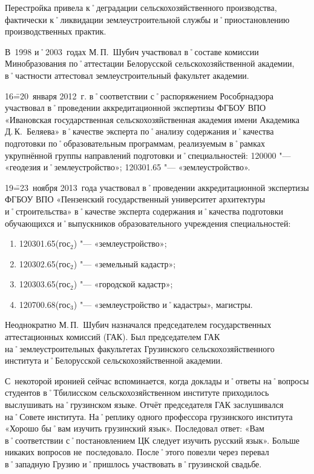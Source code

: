 Перестройка привела к˚деградации сельскохозяйственного производства, фактически к˚ликвидации землеустроительной службы и˚приостановлению производственных практик. 

В~1998 и˚2003~годах М.\,П.~Шубич участвовал в˚составе комиссии Минобразования по˚аттестации Белорусской сельскохозяйственной академии, в˚частности аттестовал землеустроительный факультет академии. 

16\==20~января 2012~г. в˚соответствии с˚распоряжением Рособрнадзора участвовал в˚проведении аккредитационной экспертизы ФГБОУ ВПО «Ивановская государственная сельскохозяйственная академия имени Академика Д.\,К.~Беляева» в˚качестве эксперта по˚анализу содержания и˚качества подготовки по˚образовательным программам, реализуемым в˚рамках укрупнённой группы направлений подготовки и˚специальностей: 120000 "--- «геодезия и˚землеустройство»; 120301.65 "--- «землеустройство».

19\==23~ноября 2013~года участвовал в˚проведении аккредитационной экспертизы ФГБОУ ВПО «Пензенский государственный университет архитектуры и˚строительства» в˚качестве эксперта содержания и˚качества подготовки обучающихся и˚выпускников образовательного учреждения специальностей:

\begin{enumerate}
	\item 120301.65(гос$_2$) "--- «землеустройство»; 
	\item 120302.65(гос$_2$) "--- «земельный кадастр»; 
	\item 120303.65(гос$_2$) "--- «городской кадастр»; 
 	\item 120700.68(гос$_3$) "--- «землеустройство и˚кадастры», магистры.
\end{enumerate}

Неоднократно М.\,П.~Шубич назначался председателем государственных аттестационных комиссий (ГАК). Был председателем ГАК на˚землеустроительных факультетах Грузинского сельскохозяйственного института и˚Белорусской сельскохозяйственной академии. 

С~некоторой иронией сейчас вспоминается, когда доклады и˚ответы на˚вопросы студентов в˚Тбилисском сельскохозяйственном институте приходилось выслушивать на˚грузинском языке. Отчёт председателя ГАК заслушивался на˚Совете института. На˚реплику одного профессора грузинского института «Хорошо бы˚вам изучить грузинский язык». Последовал ответ: «Вам в˚соответствии с˚постановлением ЦК следует изучить русский язык». Больше никаких вопросов не~последовало. После˚этого повезли через перевал в˚западную Грузию и˚пришлось участвовать в˚грузинской свадьбе.

